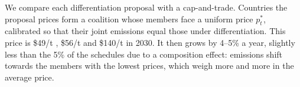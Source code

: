 \documentclass[12pt,english]{article}
\theoremstyle{remark}
\begin{document}
We compare each differentiation proposal with a cap-and-trade. Countries the proposal prices form a coalition whose members face a uniform price $p^*_t$, calibrated so that their joint emissions equal those under differentiation. %
This price is \$49/t \citep{wolfram_building_2025}, \$56/t \citep{banerjee_grand_2025} and \$140/t \citep{equal_right_climate_2023} in 2030. It then grows by 4--5\% a year, slightly less than the 5\% of the schedules due to a composition effect: emissions shift towards the members with the lowest prices, which weigh more and more in the average price. %
\end{document}
